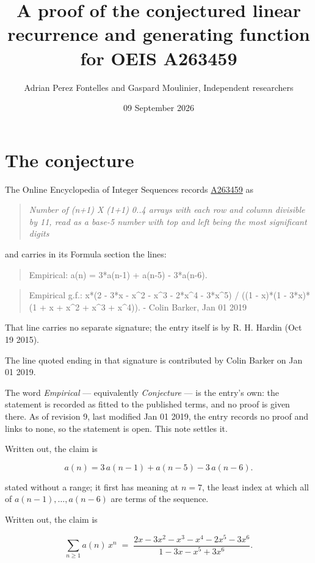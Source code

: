 \documentclass[11pt]{article}
\title{A proof of the conjectured linear recurrence and generating function for OEIS A263459}
\author{Adrian Perez Fontelles and Gaspard Moulinier, Independent researchers}
\date{09 September 2026}
\theoremstyle{definition}
\begin{document}
\maketitle
\section{The conjecture}

The Online Encyclopedia of Integer Sequences records \href{https://oeis.org/A263459}{A263459} as

\begin{quote}\itshape Number of (n+1) X (1+1) 0..4 arrays with each row and column divisible by 11, read as a base-5 number with top and left being the most significant digits\end{quote}

and carries in its Formula section the lines:

\begin{quote}\ttfamily Empirical: a(n) = 3*a(n-1) + a(n-5) - 3*a(n-6).\end{quote}

\begin{quote}\ttfamily Empirical g.f.: x*(2 - 3*x - x\textasciicircum{}2 - x\textasciicircum{}3 - 2*x\textasciicircum{}4 - 3*x\textasciicircum{}5) / ((1 - x)*(1 - 3*x)*(1 + x + x\textasciicircum{}2 + x\textasciicircum{}3 + x\textasciicircum{}4)). - Colin Barker, Jan 01 2019\end{quote}

That line carries no separate signature; the entry itself is by R. H. Hardin (Oct 19 2015).

The line quoted ending in that signature is contributed by Colin Barker on Jan 01 2019.

The word {\itshape Empirical} --- equivalently {\itshape Conjecture} --- is the entry's own: the statement is recorded as fitted to the published terms, and no proof is given there. As of revision 9, last modified Jan 01 2019, the entry records no proof and links to none, so the statement is open. This note settles it.

Written out, the claim is

\[a(n) = 3\,a(n-1) + a(n-5) - 3\,a(n-6).\]

stated without a range; it first has meaning at $n = 7$, the least index at which all of $a(n-1),\dots,a(n-6)$ are terms of the sequence.

Written out, the claim is

\[\sum_{n \ge 1} a(n)\,x^n \;=\; \frac{2x - 3x^{2} - x^{3} - x^{4} - 2x^{5} - 3x^{6}}{1 - 3x - x^{5} + 3x^{6}}.\]
\end{document}
